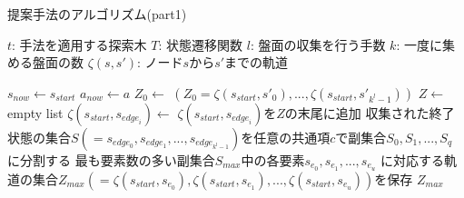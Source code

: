 \begin{algorithm}
    \caption{提案手法のアルゴリズム(part1)}
    \begin{algorithmic}[1]
        \State $t$: 手法を適用する探索木
        \State $T$: 状態遷移関数
        \State $l$: 盤面の収集を行う手数
        \State $k$: 一度に集める盤面の数
        \State $\zeta(s, s')$: ノード$s$から$s'$までの軌道
        
       
           \State $s_{now}\gets s_{start}$
           \State $a_{now}\gets a$
           \State $Z_0 \gets$
           \State $(Z_0 ={\zeta(s_{start}, {s'}_0), ..., \zeta(s_{start}, {s'}_{k^l-1})})$
           \State $ Z \gets$ empty list
             \State $\zeta(s_{start}, s_{{edge}_i}) \gets$ 
             \State $\zeta(s_{start}, s_{{edge}_i})$を$Z$の末尾に追加
           \EndFor
           \State 収集された終了状態の集合$S(={s_{edge_0},s_{edge_1}, ..., s_{edge_{k^l-1}}})$を任意の共通項$c$で副集合${S_0, S_1, ..., S_q}$に分割する
           \State 最も要素数の多い副集合$S_{max}$中の各要素${s_{e_0}, s_{e_1}, ...,  s_{e_u}}$
           \State に対応する軌道の集合$Z_{max}(=\zeta(s_{start}, s_{e_0}), \zeta(s_{start}, s_{e_1}), ..., \zeta(s_{start}, s_{e_u}))$を保存
           \State \Return $Z_{max}$
        \EndFunction
    \end{algorithmic}
\end{algorithm}
